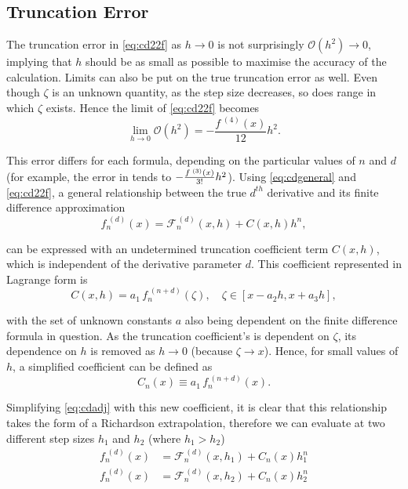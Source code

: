 \subsection{Truncation Error}\label{sec:truncerr}

The truncation error in \cref{eq:cd22f} as $h\!\to\!0$ is not surprisingly $\mathcal{O}(h^2)\!\to\!0$, implying that $h$ should be as small as possible to maximise the accuracy of the calculation.
Limits can also be put on the true truncation error as well.
Even though $\zeta$ is an unknown quantity, as the step size decreases, so does range in which $\zeta$ exists.
Hence the limit of \cref{eq:cd22f} becomes
\begin{equation}
\lim_{h \to 0}\mathcal{O}(h^2) =  - \frac{f^{\;(4)}(x)}{12}h^2.
\end{equation}

This error differs for each formula, depending on the particular values of $n$ and $d$ (for example, the error in  tends to $\cramped{-\frac{f^{\;(3)}(x)}{3!}h^2}$).
Using \cref{eq:cdgeneral} and \cref{eq:cd22f}, a general relationship between the true $d^{th}$ derivative and its finite difference approximation
\begin{equation}
 f_n^{\;(d)}(x) = \mathcal{F}_n^{\,(d)}(x,h) + C(x,h)h^n,\label{eq:cdadj}
\end{equation}

can be expressed with an undetermined truncation coefficient term $C(x,h)$, which is independent of the derivative parameter $d$.
This coefficient represented in Lagrange form is
\begin{equation}
C(x,h) = a_1\,f_n^{\;(n+d)}(\zeta), \quad \zeta \in [x-a_2h,x+a_3h],\label{eq:cdcxh}
\end{equation}

with the set of unknown constants $a$ also being dependent on the finite difference formula in question.
As the truncation coefficient's is dependent on $\zeta$, its dependence on $h$ is removed as $h\!\to\!0$ (because $\zeta\!\to\!x$).
Hence, for small values of $h$, a simplified coefficient can be defined as
\begin{equation}
 C_n(x) \equiv a_1\,f_n^{\;(n+d)}(x).
\end{equation}

Simplifying \cref{eq:cdadj} with this new coefficient, it is clear that this relationship takes the form of a Richardson extrapolation, therefore we can evaluate at two different step sizes $h_1$ and $h_2$ (where $h_1 > h_2$)
\begin{align}
f_n^{\;(d)}(x) &= \mathcal{F}_n^{\,(d)}(x,h_1) + C_n(x)h_1^n \\
f_n^{\;(d)}(x) &= \mathcal{F}_n^{\,(d)}(x,h_2) + C_n(x)h_2^n
\end{align}

